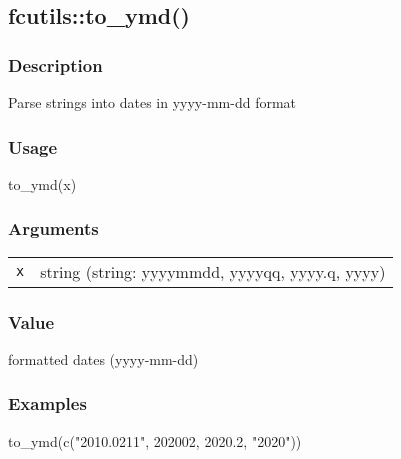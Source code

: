 \documentclass[
  letterpaper,
  DIV=11,
  numbers=noendperiod]{scrreport}
\newenvironment{Shaded}{\begin{snugshade}}{\end{snugshade}}
\newcommand{\DecValTok}[1]{\textcolor[rgb]{0.68,0.00,0.00}{#1}}
\newcommand{\FloatTok}[1]{\textcolor[rgb]{0.68,0.00,0.00}{#1}}
\newcommand{\FunctionTok}[1]{\textcolor[rgb]{0.28,0.35,0.67}{#1}}
\newcommand{\NormalTok}[1]{\textcolor[rgb]{0.00,0.23,0.31}{#1}}
\newcommand{\StringTok}[1]{\textcolor[rgb]{0.13,0.47,0.30}{#1}}
\begin{document}
\subsection{fcutils::to\_ymd()}\label{fcutilsto_ymd}

\subsubsection{Description}\label{description-23}

Parse strings into dates in yyyy-mm-dd format

\subsubsection{Usage}\label{usage-23}

\begin{Shaded}
\begin{Highlighting}[]
\FunctionTok{to\_ymd}\NormalTok{(x)}
\end{Highlighting}
\end{Shaded}

\subsubsection{Arguments}\label{arguments-23}

\begin{longtable}[]{@{}ll@{}}
\toprule\noalign{}
\endhead
\bottomrule\noalign{}
\endlastfoot
\texttt{x} & string (string: yyyymmdd, yyyyqq, yyyy.q, yyyy) \\
\end{longtable}

\subsubsection{Value}\label{value-23}

formatted dates (yyyy-mm-dd)

\subsubsection{Examples}\label{examples-23}

\begin{Shaded}
\begin{Highlighting}[]
\FunctionTok{to\_ymd}\NormalTok{(}\FunctionTok{c}\NormalTok{(}\StringTok{"2010.0211"}\NormalTok{, }\DecValTok{202002}\NormalTok{, }\FloatTok{2020.2}\NormalTok{, }\StringTok{"2020"}\NormalTok{))}
\end{Highlighting}
\end{Shaded}
\end{document}
